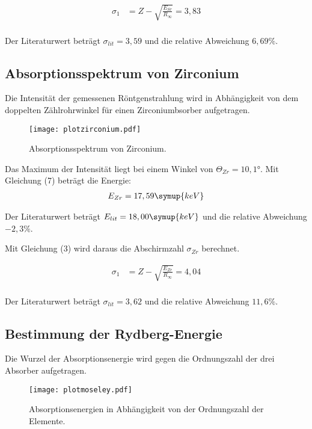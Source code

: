 \begin{align*}
  \sigma_1 &= Z - \sqrt{\frac{E_{Sr}}{R_{\infty}}} = 3,83 \\
\end{align*}

Der Literaturwert beträgt $\sigma_{lit} = 3,59$ und die relative Abweichung $6,69\%$.


\subsection{Absorptionsspektrum von Zirconium}

Die Intensität der gemessenen Röntgenstrahlung wird in Abhängigkeit von dem doppelten Zählrohrwinkel für
einen Zirconiumbsorber aufgetragen.

\begin{figure}[H]
  \centering
  \texttt{[image: plotzirconium.pdf]}
  \caption{Absorptionsspektrum von Zirconium.}
  \label{fig:plot}
\end{figure}


Das Maximum der Intensität liegt bei einem Winkel von $\Theta_{Zr} = 10,1°$.
Mit Gleichung (7) beträgt die Energie:
\begin{align*}
  E_{Zr} = 17,59 \symup{keV}
\end{align*}

Der Literaturwert beträgt $E_{lit} = 18,00 \symup{keV}$ und die relative Abweichung $-2,3\%$.

Mit Gleichung (3) wird daraus die Abschirmzahl $\sigma_{Zr}$  berechnet.

\begin{align*}
  \sigma_1 &= Z - \sqrt{\frac{E_{Zr}}{R_{\infty}}} = 4,04 \\
\end{align*}

Der Literaturwert beträgt $\sigma_{lit} = 3,62$ und die relative Abweichung $11,6\%$.


\subsection{Bestimmung der Rydberg-Energie}

Die Wurzel der Absorptionsenergie wird gegen die Ordnungszahl der drei Absorber aufgetragen.

\begin{figure}[H]
  \centering
  \texttt{[image: plotmoseley.pdf]}
  \caption{Absorptionsenergien in Abhängigkeit von der Ordnungszahl der Elemente.}
  \label{fig:plot}
\end{figure}

